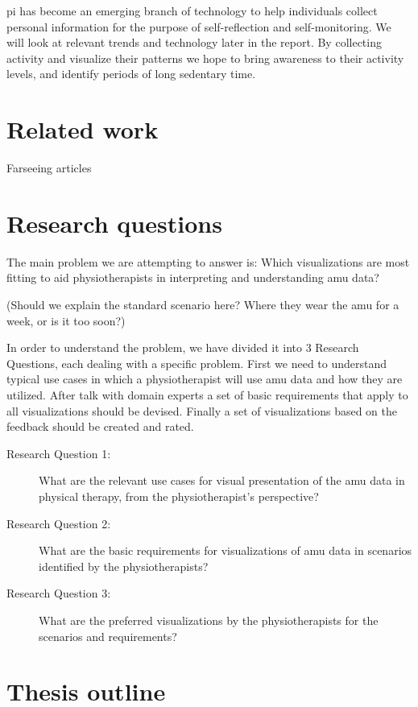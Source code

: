 \gls{pi} has become an emerging branch of technology to help individuals collect personal information for the purpose of self-reflection and self-monitoring. We will look at relevant trends and technology later in the report. By collecting activity and visualize their patterns we hope to bring awareness to their activity levels, and identify periods of long sedentary time. 

\section{Related work}
Farseeing articles

\section{Research questions}
The main problem we are attempting to answer is: Which visualizations are most fitting to aid physiotherapists in interpreting and understanding \gls{amu} data?

(Should we explain the standard scenario here? Where they wear the \gls{amu} for a week, or is it too soon?)

In order to understand the problem, we have divided it into 3 Research Questions, each dealing with a specific problem. First we need to understand typical use cases in which a physiotherapist will use \gls{amu} data and how they are utilized. After talk with domain experts a set of basic requirements that apply to all visualizations should be devised. Finally a set of visualizations based on the feedback should be created and rated.

\begin{description}
\item[Research Question 1:] What are the relevant use cases for visual presentation of the \gls{amu} data in physical therapy, from the physiotherapist's perspective?

\item[Research Question 2:] What are the basic requirements for visualizations of \gls{amu} data in scenarios identified by the physiotherapists?

\item[Research Question 3:] What are the preferred visualizations by the physiotherapists for the scenarios and requirements?
\end{description}

\section{Thesis outline}

